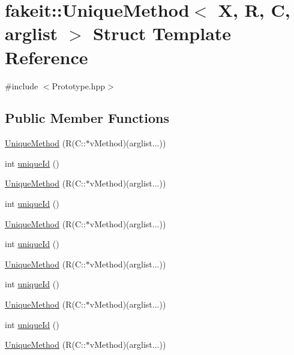 \hypertarget{structfakeit_1_1UniqueMethod}{}\section{fakeit\+::Unique\+Method$<$ X, R, C, arglist $>$ Struct Template Reference}
\label{structfakeit_1_1UniqueMethod}


{\ttfamily \#include $<$Prototype.\+hpp$>$}

\subsection*{Public Member Functions}
\begin{DoxyCompactItemize}
\item 
\mbox{\hyperlink{structfakeit_1_1UniqueMethod_ac875b964e9c0b91d8a8b5fd4363d9f20}{Unique\+Method}} (R(C\+::$\ast$v\+Method)(arglist...))
\item 
int \mbox{\hyperlink{structfakeit_1_1UniqueMethod_a9a7108ad7e5700aa48417deb30c1e2b5}{unique\+Id}} ()
\item 
\mbox{\hyperlink{structfakeit_1_1UniqueMethod_ac875b964e9c0b91d8a8b5fd4363d9f20}{Unique\+Method}} (R(C\+::$\ast$v\+Method)(arglist...))
\item 
int \mbox{\hyperlink{structfakeit_1_1UniqueMethod_a9a7108ad7e5700aa48417deb30c1e2b5}{unique\+Id}} ()
\item 
\mbox{\hyperlink{structfakeit_1_1UniqueMethod_ac875b964e9c0b91d8a8b5fd4363d9f20}{Unique\+Method}} (R(C\+::$\ast$v\+Method)(arglist...))
\item 
int \mbox{\hyperlink{structfakeit_1_1UniqueMethod_a9a7108ad7e5700aa48417deb30c1e2b5}{unique\+Id}} ()
\item 
\mbox{\hyperlink{structfakeit_1_1UniqueMethod_ac875b964e9c0b91d8a8b5fd4363d9f20}{Unique\+Method}} (R(C\+::$\ast$v\+Method)(arglist...))
\item 
int \mbox{\hyperlink{structfakeit_1_1UniqueMethod_a9a7108ad7e5700aa48417deb30c1e2b5}{unique\+Id}} ()
\item 
\mbox{\hyperlink{structfakeit_1_1UniqueMethod_ac875b964e9c0b91d8a8b5fd4363d9f20}{Unique\+Method}} (R(C\+::$\ast$v\+Method)(arglist...))
\item 
int \mbox{\hyperlink{structfakeit_1_1UniqueMethod_a9a7108ad7e5700aa48417deb30c1e2b5}{unique\+Id}} ()
\item 
\mbox{\hyperlink{structfakeit_1_1UniqueMethod_ac875b964e9c0b91d8a8b5fd4363d9f20}{Unique\+Method}} (R(C\+::$\ast$v\+Method)(arglist...))

\end{DoxyCompactItemize}
